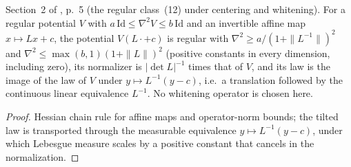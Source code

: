 \begin{lemma}
  \label{lem:bkl-regular-affine}
  \leanok
  Section~2 of \cite{BizeulKlartagLehec2026}, p.~5 (the regular class~(12) under centering and
  whitening). For a regular potential $V$ with $a\,\mathrm{Id}\le\nabla^2V\le b\,\mathrm{Id}$ and an
  invertible affine map $x\mapsto Lx+c$, the potential $V(L\cdot+c)$ is regular with
  $\nabla^2\ge a/(1+\|L^{-1}\|)^2$ and $\nabla^2\le\max(b,1)(1+\|L\|)^2$ (positive constants in
  every dimension, including zero), its normalizer is $|\det L|^{-1}$ times that of $V$, and its
  law is the image of the law of $V$ under $y\mapsto L^{-1}(y-c)$, i.e.\ a translation followed by
  the continuous linear equivalence $L^{-1}$. No whitening operator is chosen here.
\end{lemma}
\begin{proof}
  \leanok
  Hessian chain rule for affine maps and operator-norm bounds; the tilted law is transported
  through the measurable equivalence $y\mapsto L^{-1}(y-c)$, under which Lebesgue measure scales
  by a positive constant that cancels in the normalization.
\end{proof}

